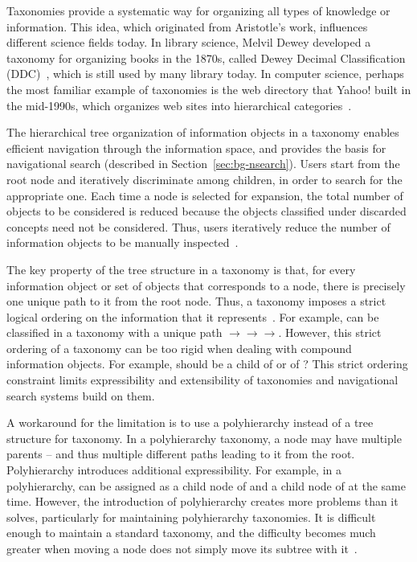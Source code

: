 Taxonomies provide a systematic way for organizing all types of knowledge or information. This idea, which originated from Aristotle's work, influences different science fields today. In library science, Melvil Dewey developed a taxonomy for organizing books in the 1870s, called Dewey Decimal Classification (DDC)~\cite{dewey1876classification}, which is still used by many library today. In computer science, perhaps the most familiar example of taxonomies is the web directory that Yahoo! built in the mid-1990s, which organizes web sites into hierarchical categories~\cite{van2008history}.

The hierarchical tree organization of information objects in a taxonomy enables efficient navigation through the information space, and provides the basis for navigational search (described in Section~\ref{sec:bg-nsearch}). Users start from the root node and iteratively discriminate among children, in order to search for the appropriate one. Each time a node is selected for expansion, the total number of objects to be considered is reduced because the objects classified under discarded concepts need not be considered. Thus, users iteratively reduce the number of information objects to be manually inspected~\cite{sacco2009dynamic}.

The key property of the tree structure in a taxonomy is that, for every information object or set of objects that corresponds to a node, there is precisely one unique path to it from the root node. Thus, a taxonomy imposes a strict logical ordering on the information that it represents~\cite{tunkelang2009faceted}. For example,  can be classified in a taxonomy with a unique path  $\rightarrow$$\rightarrow$$\rightarrow$. However, this strict ordering of a taxonomy can be too rigid when dealing with compound information objects. For example, should  be a child of  or of ? This strict ordering constraint limits expressibility and extensibility of taxonomies and navigational search systems build on them.

A workaround for the limitation is to use a polyhierarchy instead of a tree structure for taxonomy. In a polyhierarchy taxonomy, a node may have multiple parents -- and thus multiple different paths leading to it from the root. Polyhierarchy introduces additional expressibility. For example, in a polyhierarchy,  can be assigned as a child node of  and a child node of  at the same time. However, the introduction of polyhierarchy creates more problems than it solves, particularly for maintaining polyhierarchy taxonomies. It is difficult enough to maintain a standard taxonomy, and the difficulty becomes much greater when moving a node does not simply move its subtree with it~\cite{tunkelang2009faceted}.

